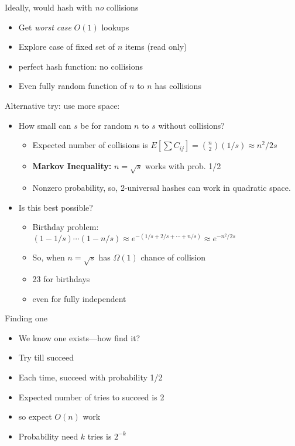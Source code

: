 \documentclass[12pt]{article}
\begin{document}
Ideally, would hash with \emph{no} collisions
\begin{itemize}
\item Get \emph{worst case} $O(1)$ lookups
\item Explore case of fixed set of $n$ items (read only)
\item perfect hash function: no collisions
\item Even fully random function of $n$ to $n$ has collisions
\end{itemize}

Alternative try: use more space:
\begin{itemize}
\item How small can $s$ be for random $n$ to $s$ without collisions?
  \begin{itemize}
  \item Expected number of collisions is $E[\sum C_{ij}] =
    \binom{n}{2}(1/s) \approx n^2/2s$
  \item \textbf{Markov Inequality:} $n=\sqrt{s}$ works with prob. 1/2 
  \item Nonzero probability, so, 2-universal hashes can work in
  quadratic space.
  \end{itemize}
\item Is this best possible?
  \begin{itemize}
  \item Birthday problem: $(1-1/s)\cdots(1-n/s) \approx
  e^{-(1/s+2/s+\cdots+n/s)} \approx e^{-n^2/2s}$
  \item So, when $n=\sqrt{s}$ has $\Omega(1)$ chance of collision
  \item 23 for birthdays
  \item even for fully independent
  \end{itemize}
\end{itemize}

Finding one
\begin{itemize}
\item We know one exists---how find it?
\item Try till succeed
\item Each time, succeed with probability 1/2
\item Expected number of tries to succeed is 2
\item so expect $O(n)$ work
\item Probability need $k$ tries is $2^{-k}$
\end{itemize}
\end{document}
